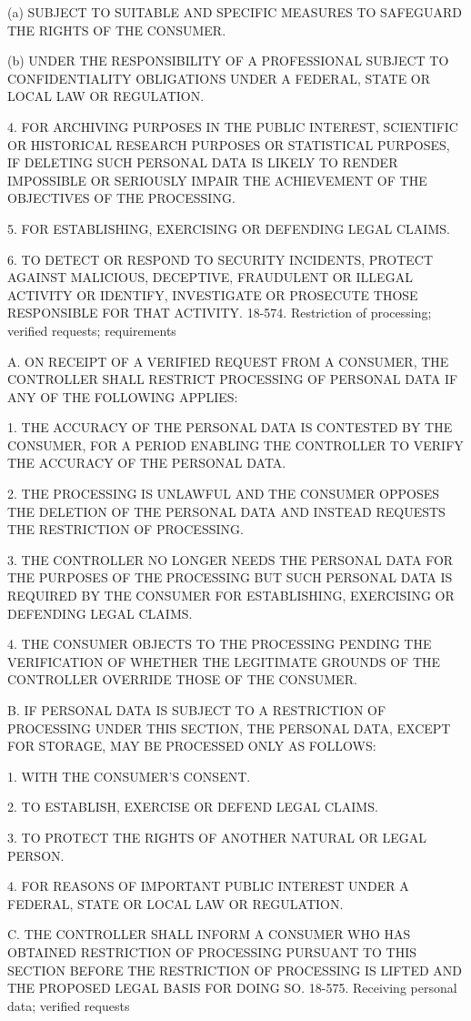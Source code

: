 (a) SUBJECT TO SUITABLE AND SPECIFIC MEASURES TO SAFEGUARD THE RIGHTS OF THE CONSUMER.

(b) UNDER THE RESPONSIBILITY OF A PROFESSIONAL SUBJECT TO CONFIDENTIALITY OBLIGATIONS UNDER A FEDERAL, STATE OR LOCAL LAW OR REGULATION.

4. FOR ARCHIVING PURPOSES IN THE PUBLIC INTEREST, SCIENTIFIC OR HISTORICAL RESEARCH PURPOSES OR STATISTICAL PURPOSES, IF DELETING SUCH PERSONAL DATA IS LIKELY TO RENDER IMPOSSIBLE OR SERIOUSLY IMPAIR THE ACHIEVEMENT OF THE OBJECTIVES OF THE PROCESSING.

5. FOR ESTABLISHING, EXERCISING OR DEFENDING LEGAL CLAIMS.

6. TO DETECT OR RESPOND TO SECURITY INCIDENTS, PROTECT AGAINST MALICIOUS, DECEPTIVE, FRAUDULENT OR ILLEGAL ACTIVITY OR IDENTIFY, INVESTIGATE OR PROSECUTE THOSE RESPONSIBLE FOR THAT ACTIVITY.
18-574. Restriction of processing; verified requests; requirements

A. ON RECEIPT OF A VERIFIED REQUEST FROM A CONSUMER, THE CONTROLLER SHALL RESTRICT PROCESSING OF PERSONAL DATA IF ANY OF THE FOLLOWING APPLIES:

1. THE ACCURACY OF THE PERSONAL DATA IS CONTESTED BY THE CONSUMER, FOR A PERIOD ENABLING THE CONTROLLER TO VERIFY THE ACCURACY OF THE PERSONAL DATA.

2. THE PROCESSING IS UNLAWFUL AND THE CONSUMER OPPOSES THE DELETION OF THE PERSONAL DATA AND INSTEAD REQUESTS THE RESTRICTION OF PROCESSING.

3. THE CONTROLLER NO LONGER NEEDS THE PERSONAL DATA FOR THE PURPOSES OF THE PROCESSING BUT SUCH PERSONAL DATA IS REQUIRED BY THE CONSUMER FOR ESTABLISHING, EXERCISING OR DEFENDING LEGAL CLAIMS.

4. THE CONSUMER OBJECTS TO THE PROCESSING PENDING THE VERIFICATION OF WHETHER THE LEGITIMATE GROUNDS OF THE CONTROLLER OVERRIDE THOSE OF THE CONSUMER.

B. IF PERSONAL DATA IS SUBJECT TO A RESTRICTION OF PROCESSING UNDER THIS SECTION, THE PERSONAL DATA, EXCEPT FOR STORAGE, MAY BE PROCESSED ONLY AS FOLLOWS:

1. WITH THE CONSUMER'S CONSENT.

2. TO ESTABLISH, EXERCISE OR DEFEND LEGAL CLAIMS.

3. TO PROTECT THE RIGHTS OF ANOTHER NATURAL OR LEGAL PERSON.

4. FOR REASONS OF IMPORTANT PUBLIC INTEREST UNDER A FEDERAL, STATE OR LOCAL LAW OR REGULATION.

C. THE CONTROLLER SHALL INFORM A CONSUMER WHO HAS OBTAINED RESTRICTION OF PROCESSING PURSUANT TO THIS SECTION BEFORE THE RESTRICTION OF PROCESSING IS LIFTED AND THE PROPOSED LEGAL BASIS FOR DOING SO.
18-575. Receiving personal data; verified requests

